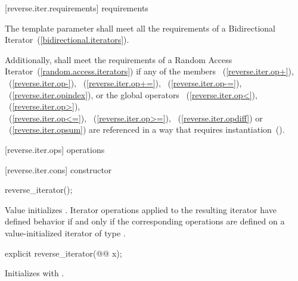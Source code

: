 \begin{removedblock}
[reverse.iter.requirements]{ requirements}

\pnum
The template parameter
shall meet all the requirements of a Bidirectional Iterator~(\ref{bidirectional.iterators}).

\pnum
Additionally,
shall meet the requirements of a Random Access Iterator~(\ref{random.access.iterators})
if any of the members
~(\ref{reverse.iter.op+}),
~(\ref{reverse.iter.op-}),
~(\ref{reverse.iter.op+=}),
~(\ref{reverse.iter.op-=}),
~(\ref{reverse.iter.opindex}),
or the global operators
~(\ref{reverse.iter.op<}),
~(\ref{reverse.iter.op>}),\\
~(\ref{reverse.iter.op<=}),
~(\ref{reverse.iter.op>=}),
~(\ref{reverse.iter.opdiff})
or
~(\ref{reverse.iter.opsum})
are referenced in a way that requires instantiation~().
\end{removedblock}

[reverse.iter.ops]{ operations}

[reverse.iter.cons]{ constructor}

%
\begin{itemdecl}
reverse_iterator();
\end{itemdecl}

\begin{itemdescr}
\pnum
\effects
Value initializes
.
Iterator operations applied to the resulting iterator have defined behavior
if and only if the corresponding operations are defined on a
value-initialized iterator of type
.
\end{itemdescr}

%

\begin{itemdecl}
explicit reverse_iterator(@@ x);
\end{itemdecl}

\begin{itemdescr}
\pnum
\effects
Initializes
with .
\end{itemdescr}

